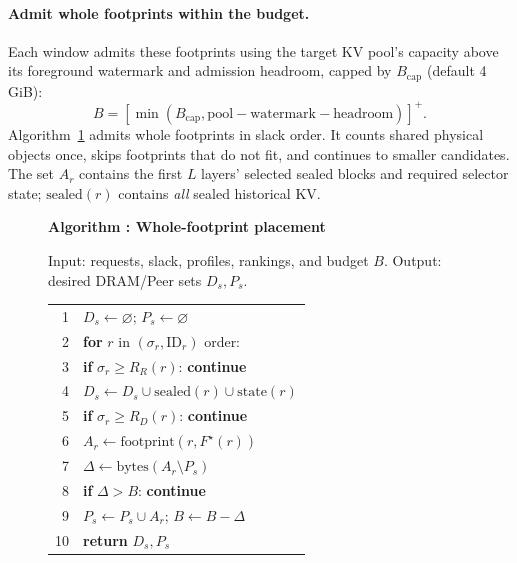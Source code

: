 \paragraph{Admit whole footprints within the budget.}

Each window admits these footprints using the target KV pool's capacity above
its foreground watermark and admission headroom, capped by
$B_{\mathrm{cap}}$ (default 4\,GiB):
\begin{equation}
 B=[\min(B_{\mathrm{cap}},\mathrm{pool}-\mathrm{watermark}
                         -\mathrm{headroom})]^+.
 \label{eq:peer-budget}
\end{equation}
Algorithm~\ref{alg:placement} admits whole footprints in slack order.
It counts shared physical objects once, skips footprints that do not
fit, and continues to smaller candidates. The set $A_r$ contains the
first $L$ layers' selected sealed blocks and required selector state;
$\mathrm{sealed}(r)$ contains \emph{all} sealed historical KV.

\begin{figure}[t]
  \raggedright
  \label{alg:placement}
  \noindent\textbf{Algorithm \thedesignalgorithm: Whole-footprint placement}
  \par\smallskip
  \noindent Input: requests, slack, profiles, rankings, and budget $B$.
  Output: desired DRAM/Peer sets $D_s,P_s$.
  \par\smallskip
  \begin{tabularx}{\columnwidth}{@{}r@{\quad}X@{}}
    \toprule
    1 & $D_s\gets\varnothing$; $P_s\gets\varnothing$ \\
    2 & \textbf{for} $r$ in $(\sigma_r,\mathrm{ID}_r)$ order: \\
    3 & \quad\textbf{if} $\sigma_r\ge R_R(r)$: \textbf{continue} \\
    4 & \quad$D_s\gets D_s\cup\mathrm{sealed}(r)\cup\mathrm{state}(r)$ \\
    5 & \quad\textbf{if} $\sigma_r\ge R_D(r)$: \textbf{continue} \\
    6 & \quad$A_r\gets\mathrm{footprint}(r,F^\star(r))$ \\
    7 & \quad$\Delta\gets\mathrm{bytes}(A_r\setminus P_s)$ \\
    8 & \quad\textbf{if} $\Delta>B$: \textbf{continue} \\
    9 & \quad$P_s\gets P_s\cup A_r$; $B\gets B-\Delta$ \\
   10 & \textbf{return} $D_s,P_s$ \\
    \bottomrule
  \end{tabularx}
\end{figure}

